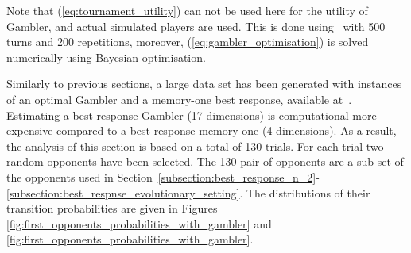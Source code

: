 Note that (\ref{eq:tournament_utility}) can not be used here for the utility
of Gambler, and actual simulated players are used. This is done using~\cite{axelrodproject}
with 500 turns and 200 repetitions, moreover, (\ref{eq:gambler_optimisation})
is solved numerically using Bayesian optimisation.

Similarly to previous sections, a large data set has been generated with
instances of an optimal Gambler and a memory-one best response, available
at~\cite{glynatsi2019}. Estimating a best response Gambler (17 dimensions) is
computational more expensive compared to a best response memory-one (4
dimensions). As a result, the analysis of this section is based on a total of
130 trials. For each trial two random opponents have been selected. The 130 pair
of opponents are a sub set of the opponents used in
Section~\ref{subsection:best_response_n_2}-
\ref{subsection:best_respnse_evolutionary_setting}. The distributions of their
transition probabilities are given in Figures
\ref{fig:first_opponents_probabilities_with_gambler} and
\ref{fig:first_opponents_probabilities_with_gambler}.


